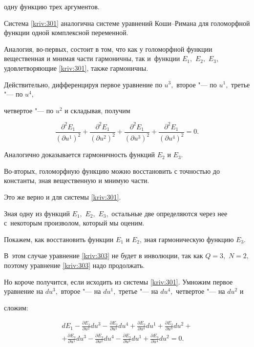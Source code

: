 одну функцию трех аргументов.



Система \eqref{kriv:301} аналогична системе уравнений Коши--Римана для голоморфной функции одной комплексной переменной. 

Аналогия, во-первых, состоит в том, что  как у голоморфной функции вещественная и мнимая части гармоничны, так и~функции $E_{1},$ $E_{2},$ $E_{3}$,  удовлетворяющие \eqref{kriv:301}, также гармоничны. 

Действительно, дифференцируя первое уравнение  по $u^{3},$ второе "--- по $u^{1},$ третье "--- по $u^{4},$ 

четвертое "---  по $u^{2}$ и складывая, получим

\begin{equation*}

\frac{\partial ^{2}E_{1}}{\left( \partial u^{1}\right) ^{2}}+\frac{\partial

^{2}E_{1}}{\left( \partial u^{2}\right) ^{2}}+\frac{\partial ^{2}E_{1}}{\left( \partial u^{3}\right) ^{2}}+\frac{\partial ^{2}E_{1}}{\left( \partial

u^{4}\right) ^{2}}=0.

\end{equation*}

Аналогично  доказывается гармоничность функций $E_{2}$ и $E_{3}.$ 

Во-вторых, голоморфную функцию можно восстановить с точностью до константы, зная вещественную и мнимую части. 

Это же верно и для  системы \eqref{kriv:301}. 

Зная одну из функций $E_{1},$ $E_{2},$ $E_{3},$ остальные две  определяются через нее с~некоторым произволом,  который мы оценим. 

Покажем, как восстановить  функции $E_{1}$ и $E_{2}$, зная гармоническую функцию $E_{3}.$ 

В~этом  случае уравнение \eqref{kriv:303} не будет в инволюции, так как $Q=3,$ $N=2,$ поэтому уравнение \eqref{kriv:303} надо продолжать. 

Но короче  получится, если исходить из системы \eqref{kriv:301}. Умножим первое уравнение на $du^{3},$ второе "--- на $du^{1},$ третье "--- на $du^{4},$ четвертое "--- на $du^{2}$ и 

сложим:

\begin{multline}

dE_{1}-\frac{\partial E_{2}}{\partial u^{2}}du^{3}-\frac{\partial E_{2}}{\partial u^{1}}du^{4}+\frac{\partial E_{2}}{\partial u^{4}}du^{1}+\frac{\partial E_{2}}{\partial u^{3}}du^{2}+ \\ 

+\frac{\partial E_{3}}{\partial u^{1}}du^{3}-\frac{\partial E_{3}}{\partial

u^{2}}du^{4}-\frac{\partial E_{3}}{\partial u^{3}}du^{1}+\frac{\partial E_{3}}{\partial u^{4}}du^{2}=0.

\label{kriv:305}

\end{multline}


